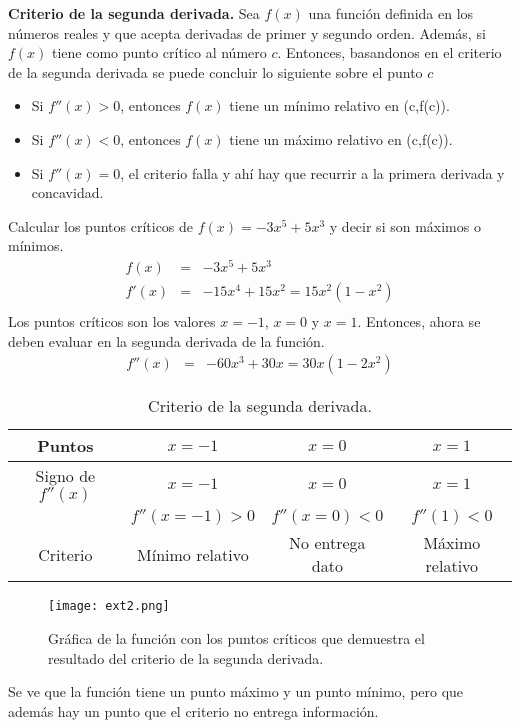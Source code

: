 \begin{mydef}
\textbf{Criterio de la segunda derivada. } Sea $f(x)$ una función definida en los números reales y que acepta derivadas de primer y segundo orden. Además, si $f(x)$ tiene como punto crítico al número $c$. Entonces, basandonos en el criterio de la segunda derivada se puede concluir lo siguiente sobre el punto $c$
\begin{itemize}
 \item Si $f''(x)>0$, entonces $f(x)$ tiene un mínimo relativo en (c,f(c)).
 \item Si $f''(x)<0$, entonces $f(x)$ tiene un máximo relativo en (c,f(c)).
 \item Si $f''(x)=0$, el criterio falla y ahí hay que recurrir a la primera derivada y concavidad.
\end{itemize}
\end{mydef}

\begin{myexample}
Calcular los puntos críticos de $f(x)=-3x^{5}+5x^{3}$ y decir si son máximos o mínimos.
\begin{eqnarray*}
f(x)&=& -3x^{5}+5x^{3}\\
f'(x)&=&-15x^{4}+15x^{2}=15x^{2}(1-x^{2})\\
\end{eqnarray*}
Los puntos críticos son los valores $x=-1$, $x=0$ y $x=1$. Entonces, ahora se deben evaluar en la segunda derivada de la función. 
\begin{eqnarray*}
f''(x)&=& -60x^{3}+30x=30x(1-2x^{2})
\end{eqnarray*}

\begin{table}[h!]
\begin{center}
		\begin{tabular}{|c|c|c|c|}
		\hline
		Puntos & $x=-1$   & $x=0$&$x=1$ \\ 
		\hline
		 Signo de $f''(x)$&$x=-1$ &$x=0$ &$x=1$   \\
		 & $f''(x=-1)>0$  & $f''(x=0)<0$&$f''(1)<0$  \\
		\hline
		Criterio &Mínimo relativo &No entrega dato& Máximo relativo \\
		\hline
		\end{tabular}
		\caption{Criterio de la segunda derivada.}
\end{center}
\end{table}

 \begin{center}
\begin{figure}[h!]
\centering
\texttt{[image: ext2.png]}
\caption{Gráfica de la función con los puntos críticos que demuestra el resultado del criterio de la segunda derivada.} \label{ext2}
\end{figure}
\end{center}

Se ve que la función tiene un punto máximo y un punto mínimo, pero que además hay un punto que el criterio no entrega información. 
\end{myexample}

